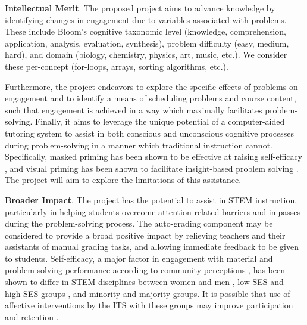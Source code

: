 \documentclass[hidelinks,11pt]{article}
\begin{document}

\textbf{Intellectual Merit}.
The proposed project aims to advance knowledge by identifying changes in
engagement due to variables associated with problems.  These include Bloom's
cognitive taxonomic level (knowledge, comprehension, application, analysis,
evaluation, synthesis), problem difficulty (easy, medium, hard), and domain
(biology, chemistry, physics, art, music, etc.).  We consider these per-concept
(for-loops, arrays, sorting algorithms, etc.).

Furthermore, the project endeavors to explore the specific effects of problems
on engagement and to identify a means of scheduling problems and course
content, such that engagement is achieved in a way which maximally facilitates
problem-solving. Finally, it aims to leverage the unique potential of a
computer-aided tutoring system to assist in both conscious and unconscious
cognitive processes during problem-solving in a manner which traditional
instruction cannot. Specifically, masked priming has been shown to be effective
at raising self-efficacy {\citep{jraidi2011}}, and visual priming has been shown
to facilitate insight-based problem solving {\citep{grant2003}}.  The project will
aim to explore the limitations of this assistance.


\textbf{Broader Impact}.
The project has the potential to assist in STEM instruction, particularly in
helping students overcome attention-related barriers and impasses during the
problem-solving process.  The auto-grading component may be considered to
provide a broad positive impact by relieving teachers and their assistants of
manual grading tasks, and allowing immediate feedback to be given to students.
Self-efficacy, a major factor in engagement with material and problem-solving
performance according to community perceptions {\citep{vivian2014}}, has been
shown to differ in STEM disciplines between women and men {\citep{boy2013}}
{\citep{gonzalez2012}, low-SES and high-SES groups \citep{gonzalez2012}}, and
minority and majority groups.  It is possible that use of affective
interventions by the ITS with these groups may improve participation and
retention {\citep{jraidi2011}}. 
\end{document}
